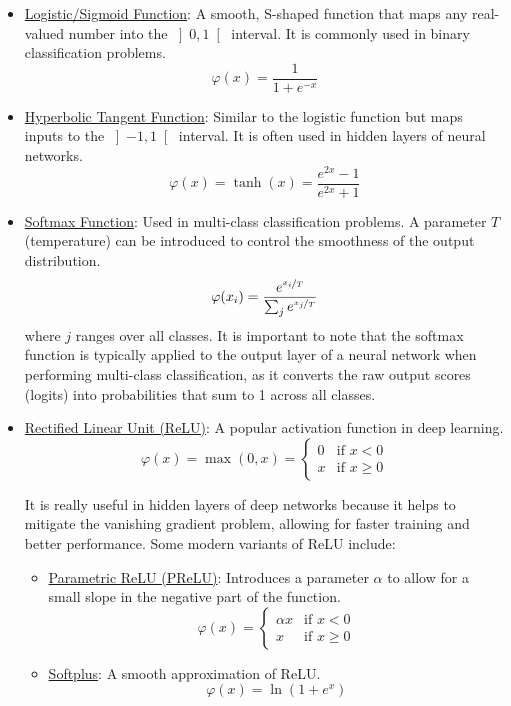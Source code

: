 \begin{itemize}
    \item \ul{Logistic/Sigmoid Function}: A smooth, S-shaped function that maps any real-valued number into the $\left]0, 1\right[$ interval. It is commonly used in binary classification problems.
    \begin{equation*}
        \varphi(x) = \frac{1}{1 + e^{-x}}
    \end{equation*}
    \item \ul{Hyperbolic Tangent Function}: Similar to the logistic function but maps inputs to the $\left]-1, 1\right[$ interval. It is often used in hidden layers of neural networks.
    \begin{equation*}
        \varphi(x) = \tanh(x) = \frac{e^{2x} - 1}{e^{2x} + 1}
    \end{equation*}
    \item \ul{Softmax Function}: Used in multi-class classification problems. A parameter $T$ (temperature) can be introduced to control the smoothness of the output distribution.
    \begin{equation*}
        \varphi(x_i) = \frac{e^{\nicefrac{x_i}{T}}}{\sum_{j} e^{\nicefrac{x_j}{T}}}
    \end{equation*}
    where $j$ ranges over all classes. It is important to note that the softmax function is typically applied to the output layer of a neural network when performing multi-class classification, as it converts the raw output scores (logits) into probabilities that sum to 1 across all classes.

    \item \ul{Rectified Linear Unit (ReLU)}: A popular activation function in deep learning.
    \begin{equation*}
        \varphi(x) = \max(0, x) = \begin{cases}
            0 & \text{if } x < 0 \\
            x & \text{if } x \geq 0
        \end{cases}
    \end{equation*}

    It is really useful in hidden layers of deep networks because it helps to mitigate the vanishing gradient problem, allowing for faster training and better performance. Some modern variants of ReLU include:
    \begin{itemize}
        \item \ul{Parametric ReLU (PReLU)}: Introduces a parameter $\alpha$ to allow for a small slope in the negative part of the function.
        \begin{equation*}
            \varphi(x) = \begin{cases}
                \alpha x & \text{if } x < 0 \\
                x & \text{if } x \geq 0
            \end{cases}
        \end{equation*}
        \item \ul{Softplus}: A smooth approximation of ReLU.
        \begin{equation*}
            \varphi(x) = \ln(1 + e^x)
        \end{equation*}
    \end{itemize}


\end{itemize}

